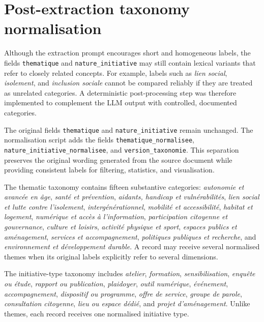 \documentclass[
11pt,
english,
singlespacing,
headsepline,
]{MastersDoctoralThesis}
\begin{document}
\section{Post-extraction taxonomy normalisation}

Although the extraction prompt encourages short and homogeneous labels, the
fields \texttt{thematique} and \texttt{nature\_initiative} may still contain
lexical variants that refer to closely related concepts. For example, labels
such as \textit{lien social}, \textit{isolement}, and \textit{inclusion sociale}
cannot be compared reliably if they are treated as unrelated categories. A
deterministic post-processing step was therefore implemented to complement the
LLM output with controlled, documented categories.

The original fields \texttt{thematique} and \texttt{nature\_initiative} remain
unchanged. The normalisation script adds the fields
\texttt{thematique\_normalisee},
\texttt{nature\_initiative\_normalisee}, and
\texttt{version\_taxonomie}. This separation preserves the original wording
generated from the source document while providing consistent labels for
filtering, statistics, and visualisation.

The thematic taxonomy contains fifteen substantive categories:
\textit{autonomie et avancée en âge}, \textit{santé et prévention},
\textit{aidants, handicap et vulnérabilités}, \textit{lien social et lutte
contre l'isolement}, \textit{intergénérationnel}, \textit{mobilité et
accessibilité}, \textit{habitat et logement}, \textit{numérique et accès à
l'information}, \textit{participation citoyenne et gouvernance},
\textit{culture et loisirs}, \textit{activité physique et sport},
\textit{espaces publics et aménagement}, \textit{services et
accompagnement}, \textit{politiques publiques et recherche}, and
\textit{environnement et développement durable}. A record may receive several
normalised themes when its original labels explicitly refer to several
dimensions.

The initiative-type taxonomy includes \textit{atelier}, \textit{formation},
\textit{sensibilisation}, \textit{enquête ou étude}, \textit{rapport ou
publication}, \textit{plaidoyer}, \textit{outil numérique},
\textit{événement}, \textit{accompagnement}, \textit{dispositif ou
programme}, \textit{offre de service}, \textit{groupe de parole},
\textit{consultation citoyenne}, \textit{lieu ou espace dédié}, and
\textit{projet d'aménagement}. Unlike themes, each record receives one
normalised initiative type.
\end{document}
